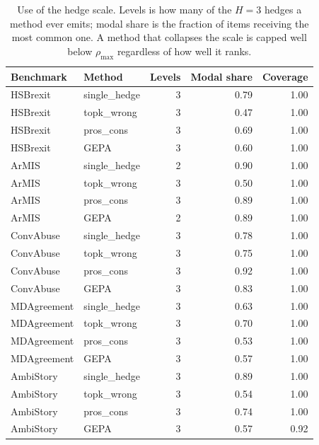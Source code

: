 \begin{table}[t]
\centering
\small
\begin{tabular}{llrrr}
\hline
Benchmark & Method & Levels & Modal share & Coverage \\
\hline
HSBrexit & single\_hedge & 3 & 0.79 & 1.00 \\
HSBrexit & topk\_wrong & 3 & 0.47 & 1.00 \\
HSBrexit & pros\_cons & 3 & 0.69 & 1.00 \\
HSBrexit & GEPA & 3 & 0.60 & 1.00 \\
ArMIS & single\_hedge & 2 & 0.90 & 1.00 \\
ArMIS & topk\_wrong & 3 & 0.50 & 1.00 \\
ArMIS & pros\_cons & 3 & 0.89 & 1.00 \\
ArMIS & GEPA & 2 & 0.89 & 1.00 \\
ConvAbuse & single\_hedge & 3 & 0.78 & 1.00 \\
ConvAbuse & topk\_wrong & 3 & 0.75 & 1.00 \\
ConvAbuse & pros\_cons & 3 & 0.92 & 1.00 \\
ConvAbuse & GEPA & 3 & 0.83 & 1.00 \\
MDAgreement & single\_hedge & 3 & 0.63 & 1.00 \\
MDAgreement & topk\_wrong & 3 & 0.70 & 1.00 \\
MDAgreement & pros\_cons & 3 & 0.53 & 1.00 \\
MDAgreement & GEPA & 3 & 0.57 & 1.00 \\
AmbiStory & single\_hedge & 3 & 0.89 & 1.00 \\
AmbiStory & topk\_wrong & 3 & 0.54 & 1.00 \\
AmbiStory & pros\_cons & 3 & 0.74 & 1.00 \\
AmbiStory & GEPA & 3 & 0.57 & 0.92 \\
\hline
\end{tabular}
\caption{Use of the hedge scale. Levels is how many of the $H=3$ hedges a method ever emits; modal share is the fraction of items receiving the most common one. A method that collapses the scale is capped well below $\rho_{\max}$ regardless of how well it ranks.}
\label{tab:stability}
\end{table}